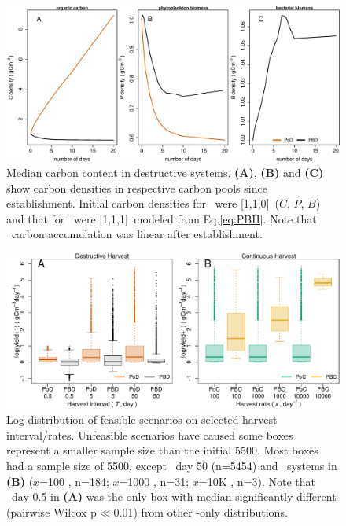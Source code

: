 \documentclass[../thesis.tex]{subfiles} %
\begin{document}
\begin{figure}[H]
    \centering
    \includegraphics[width=\linewidth]{result/Sample.pdf}
    \caption[Median carbon content in destructive systems]{Median carbon content in destructive systems.  \textbf{(A)}, \textbf{(B)} and \textbf{(C)} show carbon densities in respective carbon pools since establishment.  Initial carbon densities for \PoN\ were [1,1,0]\den\ ($C$, $P$, $B$) and that for \PBN\ were [1,1,1]\den\ modeled from Eq.\ref{eq:PBH}.  Note that \PoN\ carbon accumulation was linear after establishment.}
    \label{f:destCarbon}
\end{figure}

\begin{figure}[H]
    \centering
    \includegraphics[width=\linewidth]{result/Harvest.pdf}
    \caption[Yield flux distribution by harvest mode]{Log distribution of feasible scenarios on selected harvest interval/rates.  Unfeasible scenarios have caused some boxes represent a smaller sample size than the initial 5500.  Most boxes had a sample size of 5500, except \PBN\ day 50 (n=5454) and \PBH\ systems in \textbf{(B)} ($x$=100 \dayU, n=184; $x$=1000 \dayU, n=31; $x$=10K \dayU, n=3).  Note that \PoN\ day 0.5 in \textbf{(A)} was the only box with median significantly different (pairwise Wilcox p$\ll$0.01) from other \phy-only distributions.\lnExplain}
    \label{f:ydByHarv}
\end{figure}
\end{document}

